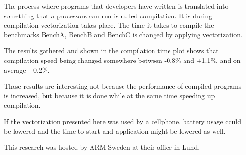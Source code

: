 \documentclass[12pt,a4paper,onecolumn,openright]{report}
\begin{document}
\begin{multicols}{2}
\begin{figure}[H]
\label{plot:cmp_time}
\end{figure}

The process where programs that developers have written is translated into something that a processors can run is called compilation. It is during compilation vectorization takes place. The time it takes to compile the benchmarks BenchA, BenchB and BenchC is changed by applying vectorization.

The results gathered and shown in the compilation time plot shows that compilation speed being changed somewhere between -0.8\% and +1.1\%, and on average +0.2\%.


These results are interesting not because the performance of compiled programs is increased, but because it is done while at the same time speeding up compilation.

If the vectorization presented here was used by a cellphone, battery usage could be lowered and the time to start and application might be lowered as well.

This research was hosted by ARM Sweden at their office in Lund.

\end{multicols}
\end{document}
